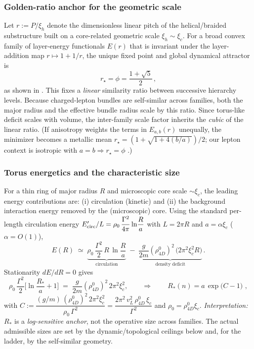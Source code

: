 \subsubsection{Golden-ratio anchor for the geometric scale}
Let \(r:=P/\xi_h\) denote the dimensionless linear pitch of the helical/braided substructure built on a core-related geometric scale \(\xi_h\sim\xi_c\). For a broad convex family of layer-energy functionals \(E(r)\) that is invariant under the layer-addition map \(r\mapsto 1+1/r\), the unique fixed point and global dynamical attractor is
\[
r_\star=\phi=\frac{1+\sqrt{5}}{2}\,,
\]
as shown in \cite{Norris2025GoldenRatio}. This fixes a \emph{linear} similarity ratio between successive hierarchy levels. Because charged-lepton bundles are self-similar across families, both the major radius and the effective bundle radius scale by this ratio. Since torus-like deficit scales with volume, the inter-family scale factor inherits the \emph{cubic} of the linear ratio. (If anisotropy weights the terms in \(E_{a,b}(r)\) unequally, the minimizer becomes a metallic mean \(r_\star=(1+\sqrt{1+4(b/a)})/2\); our lepton context is isotropic with \(a=b\Rightarrow r_\star=\phi\) \cite{Norris2025GoldenRatio}.)

\subsubsection{Torus energetics and the characteristic size}
For a thin ring of major radius \(R\) and microscopic core scale \(\sim\xi_c\), the leading energy contributions are:
(i) circulation (kinetic) and (ii) the background interaction energy removed by the (microscopic) core. Using the standard per-length circulation energy \(E'_{\rm circ}/L=\rho_0\,\dfrac{\Gamma^2}{4\pi}\ln\!\dfrac{R}{a}\) with \(L=2\pi R\) and \(a=\alpha\xi_c\) (\(\alpha=O(1)\)),
\begin{equation}
E(R)\;\simeq\;
\underbrace{\rho_0\,\frac{\Gamma^2}{2}\,R\,\ln\!\frac{R}{a}}_{\text{circulation}}
\;-\;
\underbrace{\frac{g}{2m}(\rho_{4D}^0)^2\,\big(2\pi^2\xi_c^2R\big)}_{\text{density deficit}}\,.
\label{eq:EofR}
\end{equation}
Stationarity \(dE/dR=0\) gives
\begin{equation}
\rho_0\,\frac{\Gamma^2}{2}\Big[\ln\!\frac{R_*}{a}+1\Big]\;=\;\frac{g}{2m}(\rho_{4D}^0)^2\,2\pi^2\xi_c^2,
\qquad\Rightarrow\qquad
\boxed{\,R_*(n)=a\,\exp\!\Big(C-1\Big)\,}\,,
\label{eq:Rstar}
\end{equation}
with
\(
C:=\dfrac{(g/m)\,(\rho_{4D}^0)^2\,2\pi^2\xi_c^2}{\rho_0\,\Gamma^2}
=\dfrac{2\pi^2\,v_L^2\,\rho_{4D}^0\,\xi_c}{\Gamma^2}
\)
and \(\rho_0=\rho_{4D}^0\xi_c\).
\emph{Interpretation:} \(R_*\) is a \emph{log-sensitive anchor}, not the operative size across families. The actual admissible sizes are set by the dynamic/topological ceilings below and, for the ladder, by the self-similar geometry.


